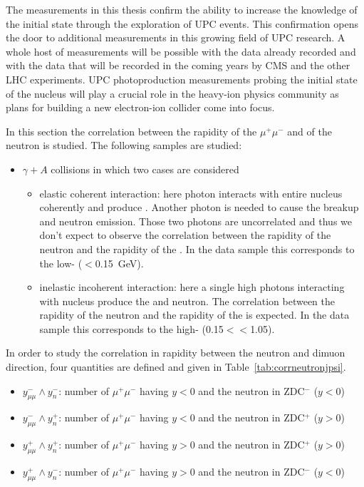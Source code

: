     The measurements in this thesis confirm the ability to increase the 
      knowledge of the initial state through the exploration of UPC events. 
    This confirmation opens the door to additional measurements in this growing 
      field of UPC research.
    A whole host of measurements will be possible with the data already 
      recorded and with the data that will be recorded in the coming years by 
      CMS and the other LHC experiments.
    UPC photoproduction measurements probing the initial state of the nucleus 
      will play a crucial role in the heavy-ion physics community as plans for 
      building a new electron-ion collider come into focus. 

\iffalse
    In this section the correlation between the rapidity of the $\mu^{+}\mu^{-}$ 
      and of the neutron is studied. The following samples are studied: 
    \begin{itemize}
      \item $\gamma + A$ collisions in which two cases are considered
      \begin{itemize}
        \item elastic coherent interaction: here photon interacts with entire
          nucleus coherently and produce \JPsi. 
          Another photon is needed to cause the breakup and neutron emission. 
          Those two photons are uncorrelated and thus we don't expect to 
            observe the correlation between the rapidity of the neutron and the
            rapidity of the \JPsi.
          In the data sample this corresponds to the low-\pt \JPsi 
            (\pt$<$0.15~GeV). 
        \item inelastic incoherent interaction: here a single high \pt photons
          interacting with nucleus produce the \JPsi and neutron. 
          The correlation between the rapidity of the neutron and the rapidity
            of the \JPsi is expected.
          In the data sample this corresponds to the high-\pt \JPsi 
            (0.15$<$\pt$<$1.05). 
      \end{itemize}
    \end{itemize}

    In order to study the correlation in rapidity between the neutron and
      dimuon direction, four quantities are defined and given in 
      Table~\ref{tab:corrneutronjpsi}.  
    \begin{itemize}
      \item $y^{-}_{\mu\mu} \wedge y_{n}^{-}$: number of $\mu^{+}\mu^{-}$ having
         $y<0$ and the neutron in ZDC$^{-}$ ($y<0$)
      \item $y^{-}_{\mu\mu} \wedge y_{n}^{+}$: number of $\mu^{+}\mu^{-}$ having
         $y<0$ and the neutron in ZDC$^{+}$ ($y>0$)
      \item $y^{+}_{\mu\mu} \wedge y_{n}^{+}$: number of $\mu^{+}\mu^{-}$ having
         $y>0$ and the neutron in ZDC$^{+}$ ($y>0$)
      \item $y^{+}_{\mu\mu} \wedge y_{n}^{-}$: number of $\mu^{+}\mu^{-}$ having
         $y>0$ and the neutron in ZDC$^{-}$ ($y<0$)
    \end{itemize}

